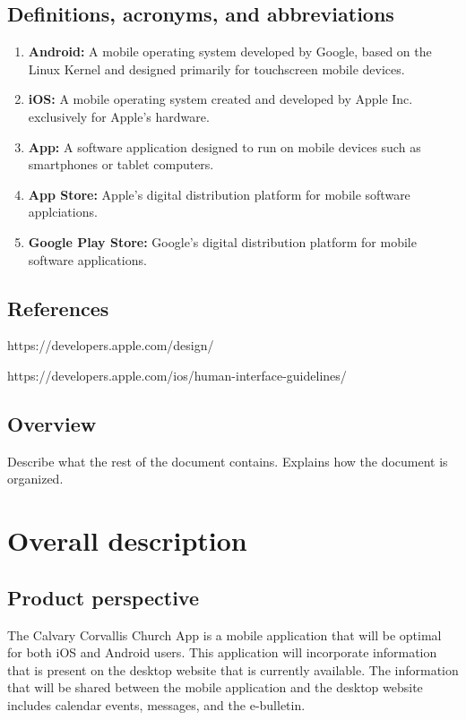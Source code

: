 \documentclass[letterpaper,10pt,draftclsnofoot,onecolumn,titlepage]{IEEEtran}
\begin{document}
	\subsection{Definitions, acronyms, and abbreviations}

	\begin{enumerate}
	\item \textbf{Android:} A mobile operating system developed by Google, based on the Linux Kernel and designed primarily for touchscreen mobile devices.
	\item \textbf{iOS:} A mobile operating system created and developed by Apple Inc. exclusively for Apple's hardware.
	\item \textbf{App:} A software application designed to run on mobile devices such as smartphones or tablet computers.
	\item \textbf{App Store:} Apple's digital distribution platform for mobile software applciations.
	\item \textbf{Google Play Store:} Google's digital distribution platform for mobile software applications.
	\end{enumerate}

	\subsection{References}
	\item https://developers.apple.com/design/
	\item https://developers.apple.com/ios/human-interface-guidelines/

	\subsection{Overview}
	Describe what the rest of the document contains.
	Explains how the document is organized.

	\section{Overall description}
	\subsection{Product perspective}
	The Calvary Corvallis Church App is a mobile application that will be optimal for both iOS and Android users.
	This application will incorporate information that is present on the desktop website that is currently available.
	The information that will be shared between the mobile application and the desktop website includes calendar events, messages, and the e-bulletin.
\end{document}
